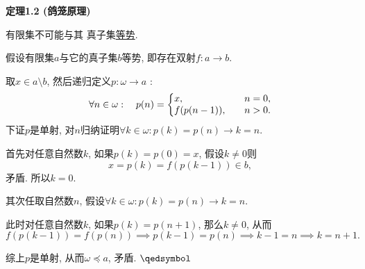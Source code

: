 \documentclass[UTF8]{ctexart}
\begin{document}
\vspace{10pt}

\hypertarget{sec:定理1.2}{}
\noindent\textbf{定理1.2 (鸽笼原理)}

有限集不可能与其
真子集\href{../../02 集合的一般构造/05 势关系#nameddest=sec:定义1.1}{等势}.



假设有限集$a$与它的真子集$b$等势, 即存在双射$f:a\to b$.

取$x\in a\setminus b$, 然后递归定义$p:\omega\to a$ :
\[\forall n\in\omega:\quad p(n)=\left\{\begin{aligned}
    &x,\quad&&n=0,\\[-3pt]
    &f(p(n-1)),\quad&&n>0.
\end{aligned}\right.\\[3pt]\]
下证$p$是单射,
对$n$归纳证明$\forall k\in\omega:p(k)=p(n)\to k=n$.

首先对任意自然数$k$, 如果$p(k)=p(0)=x$, 假设$k\neq 0$则
\[
    x=p(k)=f(p(k-1))\in b,
\]
矛盾. 所以$k=0$.

其次任取自然数$n$, 假设$\forall k\in\omega:p(k)=p(n)\to k=n$.

此时对任意自然数$k$, 如果$p(k)=p(n+1)$, 那么$k\neq 0$, 从而
\[
    f(p(k-1))=f(p(n))\implies p(k-1)=p(n)\implies k-1=n\implies k=n+1.
\]

综上$p$是单射, 从而$\omega\preccurlyeq a$, 矛盾. \hfill $\qedsymbol$

\end{document}
